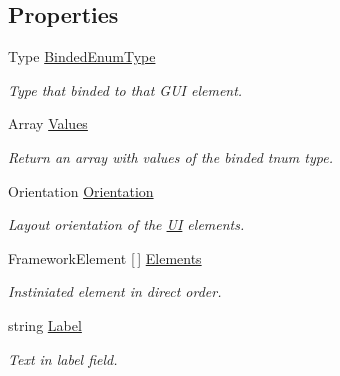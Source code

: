 \subsection*{Properties}
\begin{DoxyCompactItemize}
\item 
Type \mbox{\hyperlink{class_wpf_handler_1_1_u_i_1_1_controls_1_1_flat_toggles_group_abb4f90b5eace0651db2af6f293d312d1}{Binded\+Enum\+Type}}
\begin{DoxyCompactList}\small\item\em Type that binded to that G\+UI element. \end{DoxyCompactList}\item 
Array \mbox{\hyperlink{class_wpf_handler_1_1_u_i_1_1_controls_1_1_flat_toggles_group_a146fc04548cdc1df39cd8c9c1d4b3b00}{Values}}
\begin{DoxyCompactList}\small\item\em Return an array with values of the binded tnum type. \end{DoxyCompactList}\item 
Orientation \mbox{\hyperlink{class_wpf_handler_1_1_u_i_1_1_controls_1_1_flat_toggles_group_ab0cb4350ceae1f1288d6c83de4ed66c9}{Orientation}}
\begin{DoxyCompactList}\small\item\em Layout orientation of the \mbox{\hyperlink{namespace_wpf_handler_1_1_u_i}{UI}} elements. \end{DoxyCompactList}\item 
Framework\+Element \mbox{[}$\,$\mbox{]} \mbox{\hyperlink{class_wpf_handler_1_1_u_i_1_1_controls_1_1_flat_toggles_group_af11956552285c0b69219ab52362d3646}{Elements}}
\begin{DoxyCompactList}\small\item\em Instiniated element in direct order. \end{DoxyCompactList}\item 
string \mbox{\hyperlink{class_wpf_handler_1_1_u_i_1_1_controls_1_1_flat_toggles_group_a49e224a3505a7214029943dd421e4cd6}{Label}}
\begin{DoxyCompactList}\small\item\em Text in label field. \end{DoxyCompactList}\item 

\end{DoxyCompactItemize}
